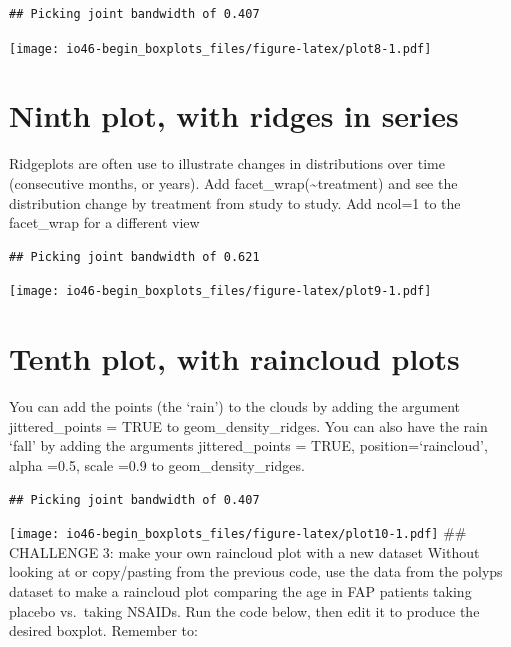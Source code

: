 \documentclass[
]{book}
\begin{document}
\begin{verbatim}
## Picking joint bandwidth of 0.407
\end{verbatim}

\texttt{[image: io46-begin\_boxplots\_files/figure-latex/plot8-1.pdf]}

\hypertarget{ninth-plot-with-ridges-in-series}{%
\section{Ninth plot, with ridges in series}\label{ninth-plot-with-ridges-in-series}}

Ridgeplots are often use to illustrate changes in distributions over time (consecutive months, or years).
Add facet\_wrap(\textasciitilde treatment) and see the distribution change by treatment from study to study.
Add ncol=1 to the facet\_wrap for a different view

\begin{verbatim}
## Picking joint bandwidth of 0.621
\end{verbatim}

\texttt{[image: io46-begin\_boxplots\_files/figure-latex/plot9-1.pdf]}

\hypertarget{tenth-plot-with-raincloud-plots}{%
\section{Tenth plot, with raincloud plots}\label{tenth-plot-with-raincloud-plots}}

You can add the points (the `rain') to the clouds by adding the argument jittered\_points = TRUE to geom\_density\_ridges.
You can also have the rain `fall' by adding the arguments jittered\_points = TRUE, position=`raincloud', alpha =0.5, scale =0.9
to geom\_density\_ridges.

\begin{verbatim}
## Picking joint bandwidth of 0.407
\end{verbatim}

\texttt{[image: io46-begin\_boxplots\_files/figure-latex/plot10-1.pdf]}
\#\# CHALLENGE 3: make your own raincloud plot with a new dataset
Without looking at or copy/pasting from the previous code,
use the data from the polyps dataset to make a raincloud plot comparing the age in FAP patients taking placebo vs.~taking NSAIDs.
Run the code below, then edit it to produce the desired boxplot.
Remember to:
\end{document}
